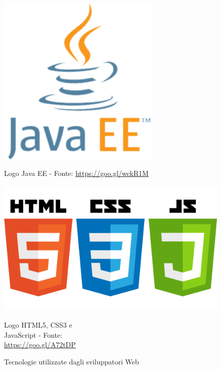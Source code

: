 \begin{figure}[htbp]
\centering
\begin{minipage}[c]{.40\textwidth}
\centering\setlength{\captionmargin}{0pt}%
\captionsetup{width=1.2\linewidth}
\includegraphics[width=0.7\textwidth]{immagini/JavaEE}
\caption{Logo Java EE - Fonte: \url{https://goo.gl/wckR1M}}
\end{minipage}%
\hspace{15mm}%
\begin{minipage}[c]{.40\textwidth}
\centering\setlength{\captionmargin}{0pt}%
\captionsetup{width=1.25\linewidth}
\includegraphics[width=1\textwidth]{immagini/HTML5_CSS_JavaScript}
\caption{Logo HTML5, CSS3 e \\JavaScript - Fonte:\\ \url{https://goo.gl/A72tDP}}
\end{minipage}
\caption{Tecnologie utilizzate dagli sviluppatori Web}
\end{figure}
		
